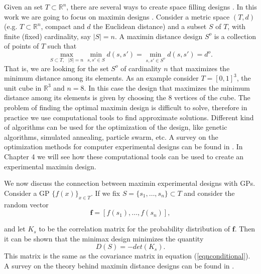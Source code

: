 \documentclass[12pt]{book}
\begin{document}
Given an set $T\subset\mathbb{R}^{n}$, there are several ways to create space filling designs 
\cite{pronzato2012design}. In this work we are going to focus on maximin designs
\cite{johnson1990minimax}. Consider a metric space $(T,d)$ (e.g.
$T\subset\mathbb{R}^{n}$, compact and $d$ the Euclidean distance) and a subset $S$ of $T$, 
with finite (fixed) cardinality, say $|S|=n$.
A maximin distance design $S^{o}$ is a collection of points of  $T$  such that
\begin{equation*}
\max_{S\subset T,\text{ }|S|=n}\min_{s,s'\in S}d(s,s')=\min_{s,s'\in S^{o}}d(s,s')=d^{o}.
\end{equation*}
That is, we are looking for the set $S^{o}$ of cardinality $n$ that maximizes the minimum distance among 
its elements. As an example consider $T=[0,1]^{3}$, the unit cube in $\mathbb{R}^{3}$ and $n=8$. In 
this case the design that maximizes the minimum distance among its elements is given by choosing
 the 8 vertices of the cube. The problem of finding
the optimal  maximin design is difficult to solve, therefore in practice we use computational tools
to find approximate solutions.  Different kind of algorithms can be used for the optimization
of the design, like genetic algorithms, simulated annealing, particle swarm, etc. A survey
on the optimization methods for computer experimental designs  can be found in 
\cite{viana2010algorithm}. In Chapter 4 we will see how  these computational tools can be used to 
create an experimental maximin design.

We now discuss the connection between maximin experimental designs with GPs. Consider a
GP $\{f(x)\}_{x\in T}$. If we fix $S=\{s_{1},\ldots,s_{n}\}\subset T$  and consider the random vector
\begin{equation*}
\textbf{f}=[f(s_{1}),\ldots,f(s_{n})],
\end{equation*}



and let $K_{s}$ to be 
the correlation matrix for the probability distribution of $\textbf{f}$. Then it can be shown
that the minimax design minimizes the quantity 
\begin{equation*}
D(S)=-det(K_{s}).
\end{equation*}
This matrix is the same as the covariance matrix in equation (\ref{eqnconditional}).
A survey on the theory behind maximin distance designs can be found in \cite{johnson1990minimax}.
\newline


\end{document}
